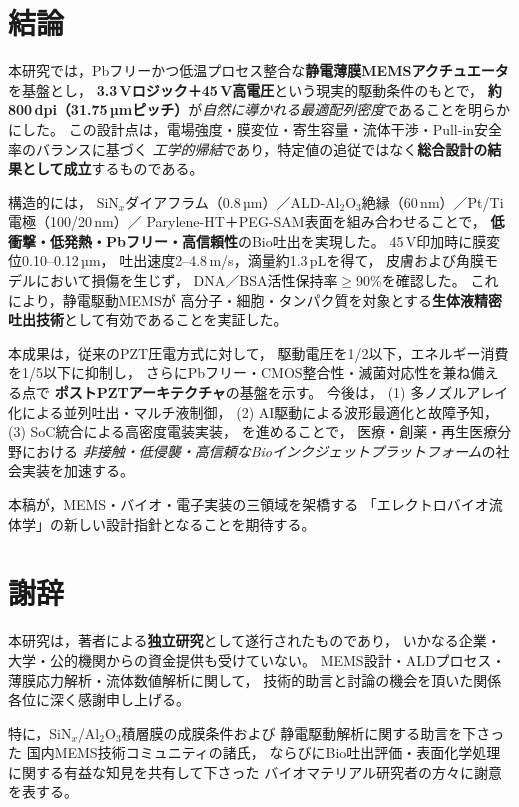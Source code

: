 \documentclass[conference]{IEEEtran}
\begin{document}
\section{結論}
本研究では，Pbフリーかつ低温プロセス整合な\textbf{静電薄膜MEMSアクチュエータ}を基盤とし，
\textbf{3.3\,Vロジック＋45\,V高電圧}という現実的駆動条件のもとで，
\textbf{約800\,dpi（31.75\,µmピッチ）}が\emph{自然に導かれる最適配列密度}であることを明らかにした。
この設計点は，電場強度・膜変位・寄生容量・流体干渉・Pull-in安全率のバランスに基づく
\emph{工学的帰結}であり，特定値の追従ではなく\textbf{総合設計の結果として成立}するものである。

構造的には，
SiN$_x$ダイアフラム（0.8\,µm）／ALD-Al$_2$O$_3$絶縁（60\,nm）／Pt/Ti電極（100/20\,nm）／
Parylene-HT＋PEG-SAM表面を組み合わせることで，
\textbf{低衝撃・低発熱・Pbフリー・高信頼性}のBio吐出を実現した。
45\,V印加時に膜変位0.10--0.12\,µm，
吐出速度2--4.8\,m/s，滴量約1.3\,pLを得て，
皮膚および角膜モデルにおいて損傷を生じず，
DNA／BSA活性保持率$\ge$90\%を確認した。
これにより，静電駆動MEMSが
高分子・細胞・タンパク質を対象とする\textbf{生体液精密吐出技術}として有効であることを実証した。

本成果は，従来のPZT圧電方式に対して，
駆動電圧を1/2以下，エネルギー消費を1/5以下に抑制し，
さらにPbフリー・CMOS整合性・滅菌対応性を兼ね備える点で
\textbf{ポストPZTアーキテクチャ}の基盤を示す。
今後は，
(1) 多ノズルアレイ化による並列吐出・マルチ液制御，  
(2) AI駆動による波形最適化と故障予知，  
(3) SoC統合による高密度電装実装，  
を進めることで，
医療・創薬・再生医療分野における
\emph{非接触・低侵襲・高信頼なBioインクジェットプラットフォーム}の社会実装を加速する。

\vspace{3pt}
\noindent
本稿が，MEMS・バイオ・電子実装の三領域を架橋する
「エレクトロバイオ流体学」の新しい設計指針となることを期待する。

\section*{謝辞}
本研究は，著者による\textbf{独立研究}として遂行されたものであり，
いかなる企業・大学・公的機関からの資金提供も受けていない。
MEMS設計・ALDプロセス・薄膜応力解析・流体数値解析に関して，
技術的助言と討論の機会を頂いた関係各位に深く感謝申し上げる。

特に，SiN$_x$/Al$_2$O$_3$積層膜の成膜条件および
静電駆動解析に関する助言を下さった
国内MEMS技術コミュニティの諸氏，
ならびにBio吐出評価・表面化学処理に関する有益な知見を共有して下さった
バイオマテリアル研究者の方々に謝意を表する。
\end{document}
